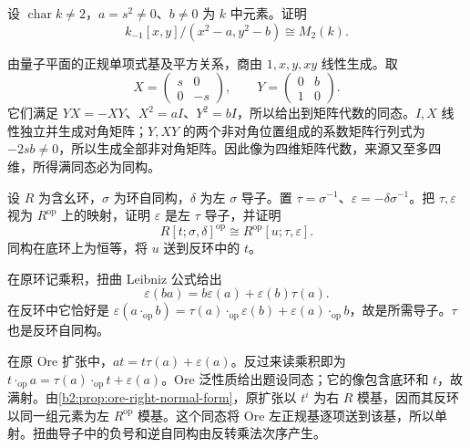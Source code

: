 \begin{optionalexercise}\label{b2:ex:20-quantum-matrix-fibre}
	设 \(\operatorname{char}k\ne2\)，\(a=s^2\ne0\)、\(b\ne0\) 为 \(k\) 中元素。证明
	\[
		k_{-1}[x,y]/(x^2-a,y^2-b)\cong M_2(k).
	\]
\end{optionalexercise}
\begin{solution}
	由量子平面的正规单项式基及平方关系，商由 \(1,x,y,xy\) 线性生成。取
	\[
		X=\begin{pmatrix}s&0\\0&-s\end{pmatrix},\qquad
		Y=\begin{pmatrix}0&b\\1&0\end{pmatrix}.
	\]
	它们满足 \(YX=-XY\)、\(X^2=aI\)、\(Y^2=bI\)，所以给出到矩阵代数的同态。\(I,X\) 线性独立并生成对角矩阵；\(Y,XY\) 的两个非对角位置组成的系数矩阵行列式为 \(-2sb\ne0\)，所以生成全部非对角矩阵。因此像为四维矩阵代数，来源又至多四维，所得满同态必为同构。
\end{solution}

\begin{optionalexercise}\label{b2:ex:20-ore-right-normal-form}
	设 \(R\) 为含幺环，\(\sigma\) 为环自同构，\(\delta\) 为左 \(\sigma\) 导子。置 \(\tau=\sigma^{-1}\)、\(\varepsilon=-\delta\sigma^{-1}\)。把 \(\tau,\varepsilon\) 视为 \(R^{\mathrm{op}}\) 上的映射，证明 \(\varepsilon\) 是左 \(\tau\) 导子，并证明
	\[
		R[t;\sigma,\delta]^{\mathrm{op}}\cong R^{\mathrm{op}}[u;\tau,\varepsilon].
	\]
	同构在底环上为恒等，将 \(u\) 送到反环中的 \(t\)。
\end{optionalexercise}
\begin{solution}
	在原环记乘积，扭曲 Leibniz 公式给出
	\[
		\varepsilon(ba)=b\varepsilon(a)+\varepsilon(b)\tau(a).
	\]
	在反环中它恰好是 \(\varepsilon(a\cdot_{\mathrm{op}}b)=\tau(a)\cdot_{\mathrm{op}}\varepsilon(b)+\varepsilon(a)\cdot_{\mathrm{op}}b\)，故是所需导子。\(\tau\) 也是反环自同构。

	在原 Ore 扩张中，\(at=t\tau(a)+\varepsilon(a)\)。反过来读乘积即为 \(t\cdot_{\mathrm{op}}a=\tau(a)\cdot_{\mathrm{op}}t+\varepsilon(a)\)。Ore 泛性质给出题设同态；它的像包含底环和 \(t\)，故满射。由\cref{b2:prop:ore-right-normal-form}，原扩张以 \(t^i\) 为右 \(R\) 模基，因而其反环以同一组元素为左 \(R^{\mathrm{op}}\) 模基。这个同态将 Ore 左正规基逐项送到该基，所以单射。扭曲导子中的负号和逆自同构由反转乘法次序产生。
\end{solution}
